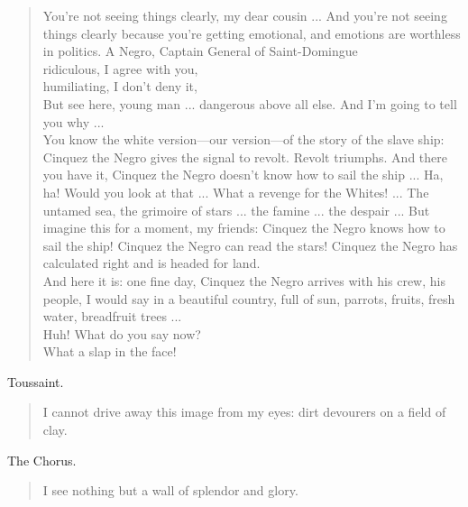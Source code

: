 \documentclass[letterpaper,article,12pt,oneside,notitlepage]{memoir}
\begin{document}
\begin{verse}
You're not seeing things clearly, my dear cousin ... And you're not seeing things clearly because you're getting emotional, and emotions are worthless in politics. A Negro, Captain General of Saint-Domingue \\
ridiculous, I agree with you, \\
humiliating, I don't deny it, \\
But see here, young man ... dangerous above all else. And I'm going to tell you why ... \\
\indent You know the white version---our version---of the story of the slave ship: Cinquez the Negro gives the signal to revolt. Revolt triumphs. And there you have it, Cinquez the Negro doesn't know how to sail the ship ... Ha, ha! Would you look at that ... What a revenge for the Whites! ... The untamed sea, the grimoire of stars ... the famine ... the despair ... But imagine this for a moment, my friends: Cinquez the Negro knows how to sail the ship! Cinquez the Negro can read the stars! Cinquez the Negro has calculated right and is headed for land. \\
\indent And here it is: one fine day, Cinquez the Negro arrives with his crew, his people, I would say in a beautiful country, full of sun, parrots, fruits, fresh water, breadfruit trees ... \\
\hspace{1cm} Huh! What do you say now? \\
\hspace{1cm} What a slap in the face! \\
\end{verse}

\begin{center}Toussaint.\end{center}

\begin{verse}
\indent I cannot drive away this image from my eyes: dirt devourers on a field of clay. \\
\end{verse}

\begin{center}The Chorus.\end{center}

\begin{verse}
\hspace{1cm} I see nothing but a wall of splendor and glory. \\
\end{verse}
\end{document}
